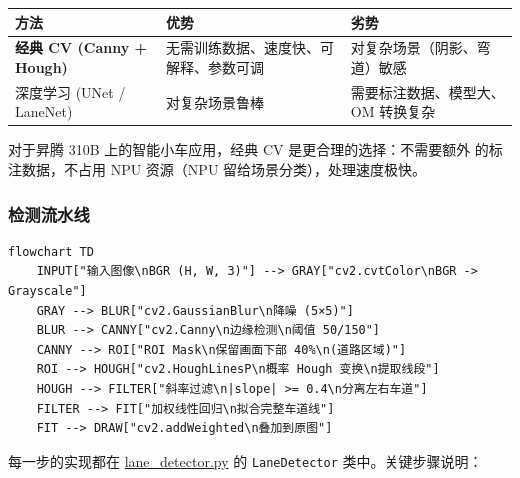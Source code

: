\begin{longtable}[]{@{}
  >{\raggedright\arraybackslash}p{}
  >{\raggedright\arraybackslash}p{}
  >{\raggedright\arraybackslash}p{}@{}}
\toprule\noalign{}
\begin{minipage}[b]{\linewidth}\raggedright
方法
\end{minipage} & \begin{minipage}[b]{\linewidth}\raggedright
优势
\end{minipage} & \begin{minipage}[b]{\linewidth}\raggedright
劣势
\end{minipage} \\
\midrule\noalign{}
\endhead
\bottomrule\noalign{}
\endlastfoot
\textbf{经典 CV (Canny + Hough)} &
无需训练数据、速度快、可解释、参数可调 & 对复杂场景（阴影、弯道）敏感 \\
深度学习 (UNet / LaneNet) & 对复杂场景鲁棒 & 需要标注数据、模型大、OM
转换复杂 \\
\end{longtable}

对于昇腾 310B 上的智能小车应用，经典 CV 是更合理的选择：不需要额外
的标注数据，不占用 NPU 资源（NPU 留给场景分类），处理速度极快。

\subsubsection{检测流水线}\label{src-experiment-case6-h11}

\begin{lstlisting}
flowchart TD
    INPUT["输入图像\nBGR (H, W, 3)"] --> GRAY["cv2.cvtColor\nBGR -> Grayscale"]
    GRAY --> BLUR["cv2.GaussianBlur\n降噪 (5×5)"]
    BLUR --> CANNY["cv2.Canny\n边缘检测\n阈值 50/150"]
    CANNY --> ROI["ROI Mask\n保留画面下部 40%\n(道路区域)"]
    ROI --> HOUGH["cv2.HoughLinesP\n概率 Hough 变换\n提取线段"]
    HOUGH --> FILTER["斜率过滤\n|slope| >= 0.4\n分离左右车道"]
    FILTER --> FIT["加权线性回归\n拟合完整车道线"]
    FIT --> DRAW["cv2.addWeighted\n叠加到原图"]
\end{lstlisting}

每一步的实现都在
\href{https://github.com/zhouxzh/Ascend310/blob/main/samples/case6/lane_detector.py}{lane\_detector.py}
的 \passthrough{\lstinline!LaneDetector!} 类中。关键步骤说明：

